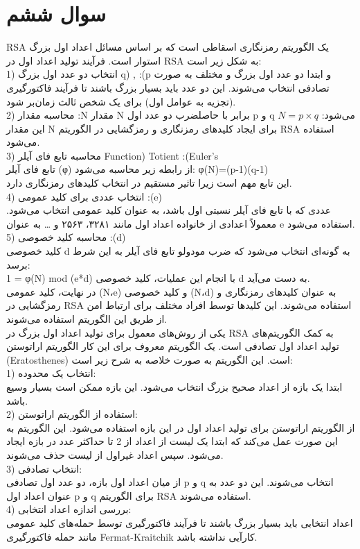 \section{سوال ششم}
RSA یک الگوریتم رمزنگاری اسقاطی است که بر اساس مسائل اعداد اول بزرگ استوار است. فرآیند تولید اعداد اول در RSA به شکل زیر است:\\
1)	انتخاب دو عدد اول بزرگ q) , :(p و  ابتدا دو عدد اول بزرگ و مختلف به صورت تصادفی انتخاب می‌شوند. این دو عدد باید بسیار بزرگ باشند تا فرآیند فاکتورگیری (تجزیه به عوامل اول) برای یک شخص ثالث زمان‌بر شود.\\
2)	محاسبه مقدار :N مقدار N برابر با حاصلضرب دو عدد اول p و q می‌شود: $N = p \times q$ این مقدار N برای ایجاد کلیدهای رمزنگاری و رمزگشایی در الگوریتم RSA استفاده می‌شود.\\
3)	محاسبه تابع فای آیلر  Function) Totient :(Euler's\\
تابع فای آیلر (φ) از رابطه زیر محاسبه می‌شود: φ(N)=(p-1)(q-1)\\
این تابع مهم است زیرا تاثیر مستقیم در انتخاب کلیدهای رمزنگاری دارد.\\
4)	انتخاب عددی برای کلید عمومی :(e)\\
عددی که با تابع فای آیلر نسبتی اول باشد، به عنوان کلید عمومی انتخاب می‌شود. معمولاً اعدادی از خانواده اعداد اول مانند ۳۲۸۱، ۲۵۶۳ و … به عنوان e استفاده می‌شود.\\
5)	محاسبه کلید خصوصی :(d)\\
کلید خصوصی d به گونه‌ای انتخاب می‌شود که ضرب مودولو تابع فای آیلر به این شرط برسد:\\
1 = φ(N) mod (e*d) با انجام این عملیات، کلید خصوصی d به دست می‌آید.\\
در نهایت، کلید عمومی (N،e) و کلید خصوصی (N،d) به عنوان کلیدهای رمزنگاری و رمزگشایی در RSA استفاده می‌شوند. این کلیدها توسط افراد مختلف برای ارتباط امن از طریق این الگوریتم استفاده می‌شوند.\\
یکی از روش‌های معمول برای تولید اعداد اول بزرگ در RSA به کمک الگوریتم‌های تولید اعداد اول تصادفی است. یک الگوریتم معروف برای این کار الگوریتم اراتوستن (Eratosthenes) است. این الگوریتم به صورت خلاصه به شرح زیر است:\\
1) انتخاب یک محدوده:\\
 ابتدا یک بازه از اعداد صحیح بزرگ انتخاب می‌شود. این بازه ممکن است بسیار وسیع باشد.\\
2) استفاده از الگوریتم اراتوستن:\\
 از الگوریتم اراتوستن برای تولید اعداد اول در این بازه استفاده می‌شود. این الگوریتم به این صورت عمل می‌کند که ابتدا یک لیست از اعداد از 2 تا حداکثر عدد در بازه ایجاد می‌شود. سپس اعداد غیراول از لیست حذف می‌شوند.\\
3) انتخاب تصادفی:\\
 از میان اعداد اول بازه، دو عدد اول تصادفی p و q انتخاب می‌شوند. این دو عدد به عنوان اعداد اول p و q برای الگوریتم RSA استفاده می‌شوند.\\
4) بررسی اندازه اعداد انتخابی:\\
اعداد انتخابی باید بسیار بزرگ باشند تا فرآیند فاکتورگیری توسط حمله‌های کلید عمومی مانند حمله فاکتورگیری Fermat-Kraitchik کارآیی نداشته باشد.\\